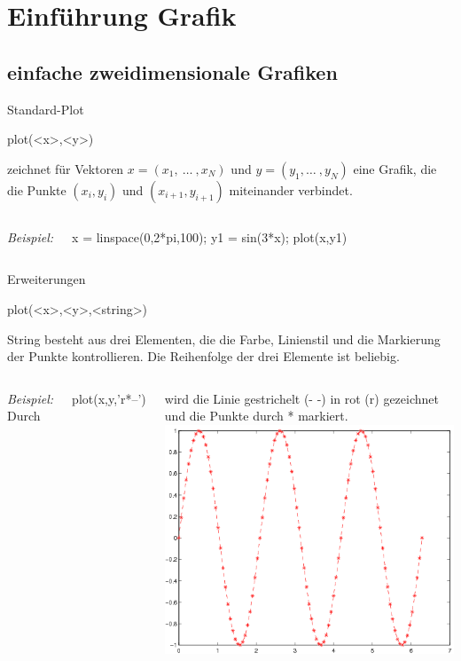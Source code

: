 \documentclass[hyperref={xetex}]{beamer}
\begin{document}
\section{Einf\"uhrung Grafik}
\subsection{einfache zweidimensionale Grafiken}
% 
% 
\begin{frame}[fragile]{Standard-Plot}
\begin{matlabin}
plot(<x>,<y>)
\end{matlabin}
zeichnet für Vektoren $x=(x_1, \ \dots \ ,x_N)$ und  $y=(y_1, \dots \ ,y_N)$
eine Grafik, die die Punkte $(x_i,y_i)$ und $(x_{i+1},y_{i+1})$ miteinander
verbindet.

\begin{columns}[c]
\textit{Beispiel:}
\begin{matlabin}
x = linspace(0,2*pi,100);
y1 = sin(3*x);
plot(x,y1)
\end{matlabin}
\end{columns}
\end{frame}
% 
% 
\begin{frame}[fragile]{Erweiterungen}
\begin{matlabin}
plot(<x>,<y>,<string>)
\end{matlabin}
\alert{String} besteht aus drei Elementen, die die Farbe, Linienstil
und die Markierung der Punkte kontrollieren. Die Reihenfolge der drei
Elemente ist beliebig.
\begin{columns}[c]
\textit{Beispiel:} Durch \\
\begin{matlabin}
plot(x,y,'r*--') 
\end{matlabin}
wird die Linie
gestrichelt (- -) in rot (r) gezeichnet und die Punkte durch *
markiert.
\includegraphics[width=\textwidth]{figures/grafik_2}
\end{columns}
\end{frame}
\end{document}
